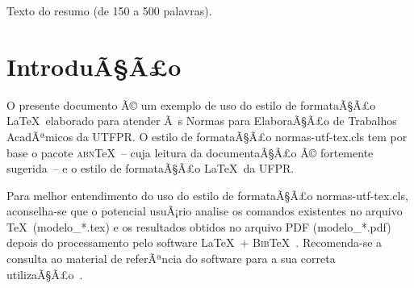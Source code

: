 \documentclass[openright]{normas-utf-tex} %
\begin{document}
\begin{resumo}
Texto do resumo (de 150 a 500 palavras).
\end{resumo}

\begin{abstract}
Abstract text (from 150 to 500 words).
\end{abstract}

\listadefiguras %
\listadetabelas %
\listadesiglas %
\listadesimbolos %

\sumario %




%
%
%
%

\newcommand\extraPages{0}
\setcounter{savepage}{\value{page}+\extraPages}
\setcounter{page}{\value{savepage}}


\chapter{IntroduÃ§Ã£o}
\label{chap:introducao}

O presente documento Ã© um exemplo de uso do estilo de formataÃ§Ã£o \LaTeX\ elaborado para atender Ã s Normas para ElaboraÃ§Ã£o de Trabalhos AcadÃªmicos da UTFPR. O estilo de formataÃ§Ã£o {\ttfamily normas-utf-tex.cls} tem por base o pacote \textsc{abn}\TeX~-- cuja leitura da documentaÃ§Ã£o \cite{abnTeX2009} Ã© fortemente sugerida~-- e o estilo de formataÃ§Ã£o \LaTeX\ da UFPR.

Para melhor entendimento do uso do estilo de formataÃ§Ã£o {\ttfamily normas-utf-tex.cls}, aconselha-se que o potencial usuÃ¡rio analise os comandos existentes no arquivo \TeX\ ({\ttfamily modelo\_*.tex}) e os resultados obtidos no arquivo PDF ({\ttfamily modelo\_*.pdf}) depois do processamento pelo software \LaTeX\ + \textsc{Bib}\TeX~\cite{LaTeX2009,BibTeX2009}. Recomenda-se a consulta ao material de referÃªncia do software para a sua correta utilizaÃ§Ã£o~\cite{Lamport1986,Buerger1989,Kopka2003,Mittelbach2004}.
\end{document}
